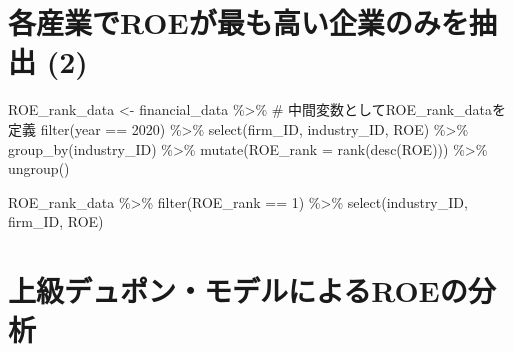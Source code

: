 \documentclass[
  letterpaper,
  DIV=11,
  numbers=noendperiod]{scrreprt}
\newenvironment{Shaded}{\begin{snugshade}}{\end{snugshade}}
\newcommand{\AttributeTok}[1]{\textcolor[rgb]{0.40,0.45,0.13}{#1}}
\newcommand{\CommentTok}[1]{\textcolor[rgb]{0.37,0.37,0.37}{#1}}
\newcommand{\DecValTok}[1]{\textcolor[rgb]{0.68,0.00,0.00}{#1}}
\newcommand{\FunctionTok}[1]{\textcolor[rgb]{0.28,0.35,0.67}{#1}}
\newcommand{\NormalTok}[1]{\textcolor[rgb]{0.00,0.23,0.31}{#1}}
\newcommand{\OtherTok}[1]{\textcolor[rgb]{0.00,0.23,0.31}{#1}}
\newcommand{\SpecialCharTok}[1]{\textcolor[rgb]{0.37,0.37,0.37}{#1}}
\begin{document}
\section{各産業でROEが最も高い企業のみを抽出
(2)}\label{ux5404ux7523ux696dux3067roeux304cux6700ux3082ux9ad8ux3044ux4f01ux696dux306eux307fux3092ux62bdux51fa-2}

\begin{Shaded}
\begin{Highlighting}[]
\NormalTok{ROE\_rank\_data }\OtherTok{\textless{}{-}}\NormalTok{ financial\_data }\SpecialCharTok{\%\textgreater{}\%} \CommentTok{\# 中間変数としてROE\_rank\_dataを定義}
  \FunctionTok{filter}\NormalTok{(year }\SpecialCharTok{==} \DecValTok{2020}\NormalTok{) }\SpecialCharTok{\%\textgreater{}\%} 
  \FunctionTok{select}\NormalTok{(firm\_ID, industry\_ID, ROE) }\SpecialCharTok{\%\textgreater{}\%}
  \FunctionTok{group\_by}\NormalTok{(industry\_ID) }\SpecialCharTok{\%\textgreater{}\%}
  \FunctionTok{mutate}\NormalTok{(}\AttributeTok{ROE\_rank =} \FunctionTok{rank}\NormalTok{(}\FunctionTok{desc}\NormalTok{(ROE))) }\SpecialCharTok{\%\textgreater{}\%}
  \FunctionTok{ungroup}\NormalTok{()}

\NormalTok{ROE\_rank\_data }\SpecialCharTok{\%\textgreater{}\%}
  \FunctionTok{filter}\NormalTok{(ROE\_rank }\SpecialCharTok{==} \DecValTok{1}\NormalTok{) }\SpecialCharTok{\%\textgreater{}\%}
  \FunctionTok{select}\NormalTok{(industry\_ID, firm\_ID, ROE)}
\end{Highlighting}
\end{Shaded}

\section{上級デュポン・モデルによるROEの分析}\label{ux4e0aux7d1aux30c7ux30e5ux30ddux30f3ux30e2ux30c7ux30ebux306bux3088ux308broeux306eux5206ux6790}
\end{document}
